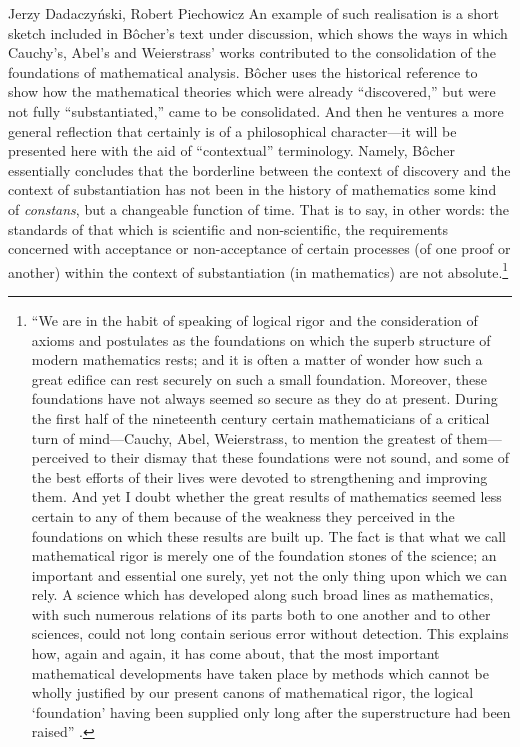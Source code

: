 \begin{artengenv}{Jerzy Dadaczyński, Robert Piechowicz}
An example of such realisation is a short sketch included in Bôcher's text under discussion, which shows the ways in which Cauchy's, Abel's and Weierstrass' works contributed to the consolidation of the foundations of mathematical analysis. Bôcher uses the historical reference to show how the mathematical theories which were already ``discovered,'' but were not fully ``substantiated,'' came to be consolidated. And then he ventures a more general reflection that certainly is of a philosophical character---it will be presented here with the aid of ``contextual'' terminology. Namely, Bôcher essentially concludes that the borderline between the context of discovery and the context of substantiation has not been in the history of mathematics some kind of \textit{constans}, but a changeable function of time. That is to say, in other words: the standards of that which is scientific and non-scientific, the requirements concerned with acceptance or non-acceptance of certain processes (of one proof or another) within the context of substantiation (in mathematics) are not absolute.\footnote{``We are in the habit of speaking of logical rigor and the consideration of axioms and postulates as the foundations on which the superb structure of modern mathematics rests; and it is often a matter of wonder how such a great edifice can rest securely on such a small foundation. Moreover, these foundations have not always seemed so secure as they do at present. During the first half of the nineteenth century certain mathematicians of a critical turn of mind---Cauchy, Abel, Weierstrass, to mention the greatest of them---perceived to their dismay that these foundations were not sound, and some of the best efforts of their lives were devoted to strengthening and improving them. And yet I doubt whether the great results of mathematics seemed less certain to any of them because of the weakness they perceived in the foundations on which these results are built up. The fact is that what we call mathematical rigor is merely one of the foundation stones of the science; an important and essential one surely, yet not the only thing upon which we can rely. A science which has developed along such broad lines as mathematics, with such numerous relations of its parts both to one another and to other sciences, could not long contain serious error without detection. This explains how, again and again, it has come about, that the most important mathematical developments have taken place by methods which cannot be wholly justified by our present canons of mathematical rigor, the logical ‘foundation' having been supplied only long after the superstructure had been raised''
\parencite[][pp.133–134]{bocher_fundamental_1904}.%
}


\end{artengenv}

